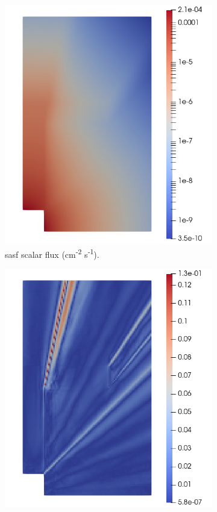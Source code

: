 \begin{figure}[H]
\begin{subfigure}[b]{0.47\textwidth}
        \includegraphics[width=\textwidth]{images/verification/sasf_kobayashi/sasf_z5.png}
        \caption{\acrshort{sasf} scalar flux (cm\textsuperscript{-2} s\textsuperscript{-1}).}
        \label{fig:verification:sasf:sasf_z5}
    \end{subfigure}
    \begin{subfigure}[b]{0.47\textwidth}
        \centering
        \includegraphics[width=\textwidth]{images/verification/sasf_kobayashi/error_z5}

\end{subfigure}
\end{figure}
